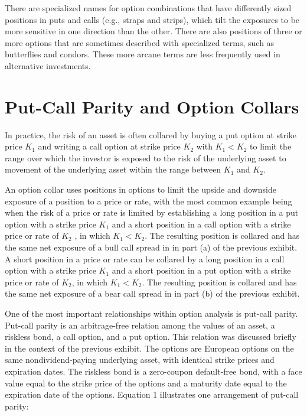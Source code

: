 \documentclass[11pt]{article}
\begin{document}
There are specialized names for option combinations that have differently sized positions in puts and calls (e.g., straps and strips), which tilt the exposures to be more sensitive in one direction than the other. There are also positions of three or more options that are sometimes described with specialized terms, such as butterflies and condors. These more arcane terms are less frequently used in alternative investments.

\section*{Put-Call Parity and Option Collars}
In practice, the risk of an asset is often collared by buying a put option at strike price $K_{1}$ and writing a call option at strike price $K_{2}$ with $K_{1}<K_{2}$ to limit the range over which the investor is exposed to the risk of the underlying asset to movement of the underlying asset within the range between $K_{1}$ and $K_{2}$.

An option collar uses positions in options to limit the upside and downside exposure of a position to a price or rate, with the most common example being when the risk of a price or rate is limited by establishing a long position in a put option with a strike price $K_{1}$ and a short position in a call option with a strike price or rate of $K_{2}$ , in which $K_{1}<K_{2}$. The resulting position is collared and has the same net exposure of a bull call spread in in part (a) of the previous exhibit. A short position in a price or rate can be collared by a long position in a call option with a strike price $K_{1}$ and a short position in a put option with a strike price or rate of $K_{2}$, in which $K_{1}<K_{2}$. The resulting position is collared and has the same net exposure of a bear call spread in in part (b) of the previous exhibit.

One of the most important relationships within option analysis is put-call parity. Put-call parity is an arbitrage-free relation among the values of an asset, a riskless bond, a call option, and a put option. This relation was discussed briefly in the context of the previous exhibit. The options are European options on the same nondividend-paying underlying asset, with identical strike prices and expiration dates. The riskless bond is a zero-coupon default-free bond, with a face value equal to the strike price of the options and a maturity date equal to the expiration date of the options. Equation 1 illustrates one arrangement of put-call parity:
\end{document}
